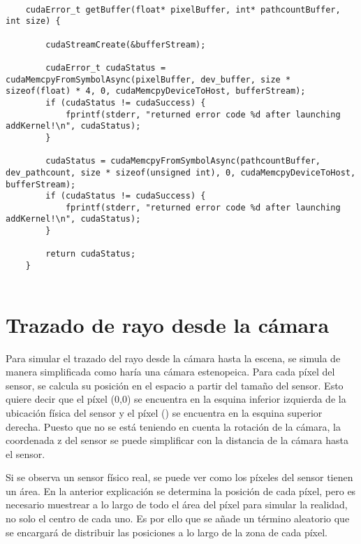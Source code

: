 \begin{minipage}[c]{0.95\textwidth}
\begin{lstlisting}[label={cod:getbuffer}, caption={Código para obtener los buffers de la GPU}]
	
	cudaError_t getBuffer(float* pixelBuffer, int* pathcountBuffer, int size) {

		cudaStreamCreate(&bufferStream);

		cudaError_t cudaStatus = cudaMemcpyFromSymbolAsync(pixelBuffer, dev_buffer, size * sizeof(float) * 4, 0, cudaMemcpyDeviceToHost, bufferStream);
		if (cudaStatus != cudaSuccess) {
			fprintf(stderr, "returned error code %d after launching addKernel!\n", cudaStatus);
		}

		cudaStatus = cudaMemcpyFromSymbolAsync(pathcountBuffer, dev_pathcount, size * sizeof(unsigned int), 0, cudaMemcpyDeviceToHost, bufferStream);
		if (cudaStatus != cudaSuccess) {
			fprintf(stderr, "returned error code %d after launching addKernel!\n", cudaStatus);
		}

		return cudaStatus;
	}
	
\end{lstlisting}
\end{minipage}


\section{Trazado de rayo desde la cámara}
\label{sec:calculatecameraray}

Para simular el trazado del rayo desde la cámara hasta la escena, se simula de manera simplificada como haría una cámara estenopeica. Para cada píxel del sensor, se calcula su posición en el espacio a partir del tamaño del sensor. Esto quiere decir que el píxel (0,0) se encuentra en la esquina inferior izquierda de la ubicación física del sensor y el píxel () se encuentra en la esquina superior derecha. Puesto que no se está teniendo en cuenta la rotación de la cámara, la coordenada z del sensor se puede simplificar con la distancia de la cámara hasta el sensor.

Si se observa un sensor físico real, se puede ver como los píxeles del sensor tienen un área. En la anterior explicación se determina la posición de cada píxel, pero es necesario muestrear a lo largo de todo el área del píxel para simular la realidad, no solo el centro de cada uno. Es por ello que se añade un término aleatorio  que se encargará de distribuir las posiciones a lo largo de la zona de cada píxel.

